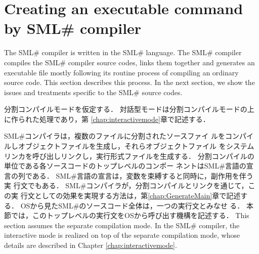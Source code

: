 \documentclass{jbook}
\newif\ifjp
\newcommand{\txt}[2]{#2}
\newcommand{\smlsharp}{SML\#}
\newcommand{\code}[1]{\mbox{\large\tt #1}}
\begin{document}
\section{\txt{\smlsharp{}コンパイラによる実行形式プログラムの生成}{Creating an
executable command by \smlsharp{} compiler}}
\label{sec:SimpleMain.generateExec}

\ifjp%
	\smlsharp{}コンパイラは，\smlsharp{}言語のソースコードとして書か
れている．
	\smlsharp{}コンパイラコマンド\code{smlsharp}も，ほぼ通常の
\smlsharp{}言語のソースコードと同様にコンパイル・リンクされ，実行ファイ
ルとして生成される．
	本節では，\smlsharp{}コンパイラが通常のソースファイルをコンパイ
ルし，OSから起動できる実行形式コマンドを生成する機構を記述する．
	次節で，\smlsharp{}コンパイラソースコード特有の処理を記述する．
\else%
	The \smlsharp{} compiler is written in the \smlsharp{} language.
	The \smlsharp{} compiler compiles the \smlsharp{} compiler
source codes, links them together and generates an executable file
mostly following its routine process of compiling an ordinary source
code.
	This section describes this process.
	In the next section, we show the issues and treatments specific
to the \smlsharp{} source codes.
\fi%

\ifjp%
	分割コンパイルモードを仮定する．
	対話型モードは分割コンパイルモードの上に作られた処理であり，第
\ref{chap:interactivemode}章で記述する．

	\smlsharp{}コンパイラは，複数のファイルに分割されたソースファイ
ルをコンパイルしオブジェクトファイルを生成し，それらオブジェクトファイル
をシステムリンカを呼び出しリンクし，実行形式ファイルを生成する．
	分割コンパイルの単位である各ソースコードのトップレベルのコンポー
ネントは\smlsharp{}言語の宣言の列である．
	\smlsharp{}言語の宣言は，変数を束縛すると同時に，副作用を伴う実
行文でもある．
	\smlsharp{}コンパイラが，分割コンパイルとリンクを通じて，この実
行文としての効果を実現する方法は，第\ref{chap:GenerateMain}章で記述する．
	OSから見た\smlsharp{}のソースコード全体は，一つの実行文とみなせ
る．
	本節では，このトップレベルの実行文をOSから呼び出す機構を記述する．
\else%
	This section assumes the separate compilation mode.
	In the \smlsharp{} compiler, the interactive mode is realized
on top of the separate compilation mode, whose details are described in
Chapter \ref{chap:interactivemode}.
\end{document}
